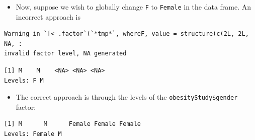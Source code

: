 \documentclass[
  9pt,
  a4paper,
  ignorenonframetext,
  notheorems]{beamer}
\newenvironment{Shaded}{\begin{snugshade}}{\end{snugshade}}
\newcommand{\CommentTok}[1]{\textcolor[rgb]{0.37,0.37,0.37}{#1}}
\newcommand{\DecValTok}[1]{\textcolor[rgb]{0.68,0.00,0.00}{#1}}
\newcommand{\FunctionTok}[1]{\textcolor[rgb]{0.28,0.35,0.67}{#1}}
\newcommand{\NormalTok}[1]{\textcolor[rgb]{0.00,0.23,0.31}{#1}}
\newcommand{\OtherTok}[1]{\textcolor[rgb]{0.00,0.23,0.31}{#1}}
\newcommand{\SpecialCharTok}[1]{\textcolor[rgb]{0.37,0.37,0.37}{#1}}
\newcommand{\StringTok}[1]{\textcolor[rgb]{0.13,0.47,0.30}{#1}}
\providecommand{\tightlist}{%
  \setlength{\itemsep}{0pt}\setlength{\parskip}{0pt}}\usepackage{longtable,booktabs,array}
\begin{document}
\begin{frame}[fragile]
\begin{itemize}
\tightlist
\item
  Now, suppose we wish to globally change \texttt{F} to \texttt{Female}
  in the data frame. An incorrect approach is
\end{itemize}

\begin{Shaded}
\end{Shaded}

\begin{verbatim}
Warning in `[<-.factor`(`*tmp*`, whereF, value = structure(c(2L, 2L, NA, :
invalid factor level, NA generated
\end{verbatim}

\begin{Shaded}
\end{Shaded}

\begin{verbatim}
[1] M    M    <NA> <NA> <NA>
Levels: F M
\end{verbatim}

\begin{itemize}
\tightlist
\item
  The correct approach is through the levels of the
  \texttt{obesityStudy\$gender} factor:
\end{itemize}

\begin{Shaded}
\end{Shaded}

\begin{verbatim}
[1] M      M      Female Female Female
Levels: Female M
\end{verbatim}
\end{frame}
\end{document}
